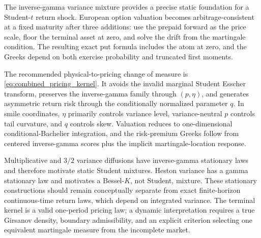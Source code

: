 \documentclass[11pt,a4paper]{article}
\begin{document}
The inverse-gamma variance mixture provides a precise static foundation for a
Student-$t$ return shock.  European option valuation becomes arbitrage-consistent
at a fixed maturity after three additions: use the prepaid forward as the price
scale, floor the terminal asset at zero, and solve the drift from the martingale
condition.  The resulting exact put formula includes the atom at zero, and the
Greeks depend on both exercise probability and truncated first moments.

The recommended physical-to-pricing change of measure is
\eqref{eq:combined_pricing_kernel}.  It avoids the invalid marginal Student
Esscher transform, preserves the inverse-gamma family through $(p,\eta)$,
and generates asymmetric return risk through the conditionally normalized
parameter $q$.  In smile coordinates, $\eta$ primarily controls variance
level, variance-neutral $p$ controls tail curvature, and $q$ controls skew.
Valuation reduces to one-dimensional conditional-Bachelier integration, and
the risk-premium Greeks follow from centered inverse-gamma scores plus the
implicit martingale-location response.

Multiplicative and $3/2$ variance diffusions have inverse-gamma stationary laws
and therefore motivate static Student mixtures.  Heston variance has a gamma
stationary law and motivates a Bessel-$K$, not Student, mixture.  These
stationary constructions should remain conceptually separate from exact
finite-horizon continuous-time return laws, which depend on integrated variance.
The terminal kernel is a valid one-period pricing law; a dynamic interpretation
requires a true Girsanov density, boundary admissibility, and an explicit
criterion selecting one equivalent martingale measure from the incomplete
market.
\end{document}
